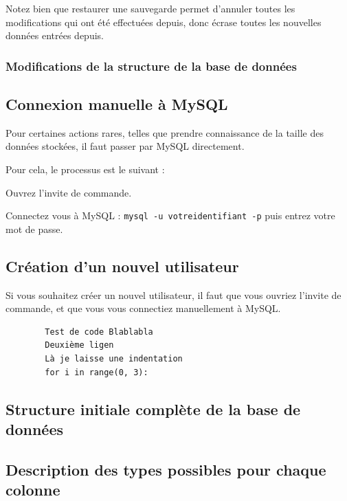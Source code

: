 \documentclass[12pt,a4paper]{article}
\begin{document}
            Notez bien que restaurer une sauvegarde permet d'annuler toutes les modifications qui ont été effectuées depuis,
            donc écrase toutes les nouvelles données entrées depuis.


        \bigskip
        \subsubsection{Modifications de la structure de la base de données}\label{modificationstructure}


    \subsection{Connexion manuelle à MySQL}\label{connexionmanuelle}
        Pour certaines actions rares, telles que prendre connaissance de la taille des
        données stockées, il faut passer par MySQL directement.

        Pour cela, le processus est le suivant : 

        Ouvrez l'invite de commande.

        Connectez vous à MySQL : \verb+mysql -u votreidentifiant -p+ puis entrez votre mot de passe.



    \subsection{Création d'un nouvel utilisateur}\label{nouvelutilisateur}
        Si vous souhaitez créer un nouvel utilisateur, il faut que vous ouvriez l'invite de commande,
        et que vous vous connectiez manuellement à MySQL.

    \begin{verbatim}
        Test de code Blablabla
        Deuxième ligen
        Là je laisse une indentation
        for i in range(0, 3):
    \end{verbatim}

\clearpage
\appendix
    \subsection{Structure initiale complète de la base de données}\label{structureinitiale}
    \subsection{Description des types possibles pour chaque colonne}\label{types}
\end{document}
